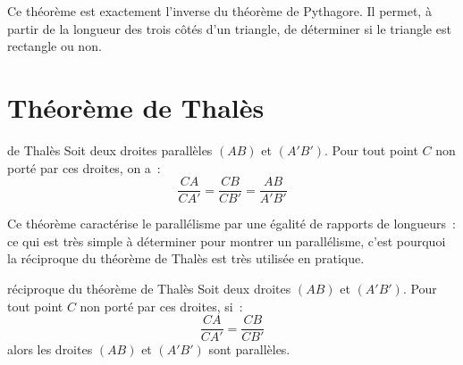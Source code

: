 \documentclass[12pt]{article}
\begin{document}
\begin{remarque}{}{}
    Ce théorème est exactement l'inverse du théorème de Pythagore. Il permet, à partir de la longueur des trois côtés d'un triangle, de déterminer si le triangle est rectangle ou non.
\end{remarque}

\section{Théorème de Thalès}

\begin{theoreme}{}{de Thalès}
    Soit deux droites parallèles $(AB)$ et $(A'B')$. Pour tout point $C$ non porté par ces droites, on a~: 
    $$\frac{CA}{CA'} = \frac{CB}{CB'} = \frac{AB}{A'B'}$$
    \begin{center}
    \end{center}
\end{theoreme}

\begin{remarque}{}{}
    Ce théorème caractérise le parallélisme par une égalité de rapports de longueurs~: ce qui est très simple à déterminer pour montrer un parallélisme, c'est pourquoi la réciproque du théorème de Thalès est très utilisée en pratique.
\end{remarque}

\begin{theoreme}{}{réciproque du théorème de Thalès}
    Soit deux droites $(AB)$ et $(A'B')$. Pour tout point $C$ non porté par ces droites, si~: 
    $$\frac{CA}{CA'} = \frac{CB}{CB'}$$
    alors les droites $(AB)$ et $(A'B')$ sont parallèles.
    \begin{center}
    \end{center}
\end{theoreme}
\end{document}
